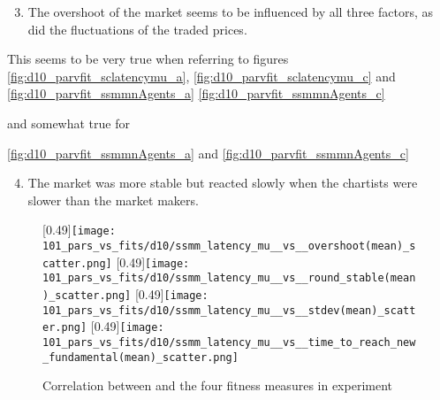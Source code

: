 \begin{enumerate}
\setcounter{enumi}{2}
\item The overshoot of the market seems to be influenced by all three factors, as did the fluctuations of the traded prices.
\end{enumerate}
This seems to be very true when referring to figures \ref{fig:d10_parvfit_sclatencymu_a}, \ref{fig:d10_parvfit_sclatencymu_c} and \ref{fig:d10_parvfit_ssmmnAgents_a} \ref{fig:d10_parvfit_ssmmnAgents_c}

and somewhat true for

\ref{fig:d10_parvfit_ssmmnAgents_a} and \ref{fig:d10_parvfit_ssmmnAgents_c}

\begin{enumerate}
\setcounter{enumi}{3}
\item The market was more stable but reacted slowly when the chartists were slower than the market makers.
\end{enumerate}



\begin{figure}
	\centering
	[0.49\linewidth]{\texttt{[image: 101\_pars\_vs\_fits/d10/ssmm\_latency\_mu\_\_vs\_\_overshoot(mean)\_scatter.png]}}
	[0.49\linewidth]{\texttt{[image: 101\_pars\_vs\_fits/d10/ssmm\_latency\_mu\_\_vs\_\_round\_stable(mean)\_scatter.png]}}
	[0.49\linewidth]{\texttt{[image: 101\_pars\_vs\_fits/d10/ssmm\_latency\_mu\_\_vs\_\_stdev(mean)\_scatter.png]}}
	[0.49\linewidth]{\texttt{[image: 101\_pars\_vs\_fits/d10/ssmm\_latency\_mu\_\_vs\_\_time\_to\_reach\_new\_fundamental(mean)\_scatter.png]}}
	\caption{Correlation between \sclatencymu and the four fitness measures in experiment \dten}
	\label{fig:d10_parvfit_ssmmlatencymu}
\end{figure}


